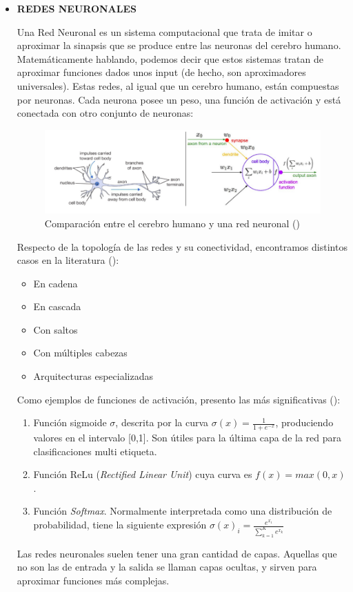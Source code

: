 \begin{itemize}
	\item \textbf{REDES NEURONALES}
	
	Una Red Neuronal es un sistema computacional que trata de imitar o aproximar la sinapsis que se produce entre las neuronas del cerebro humano. Matemáticamente hablando, podemos decir que estos sistemas tratan de aproximar funciones dados unos input (de hecho, son aproximadores universales). Estas redes, al igual que un cerebro humano, están compuestas por neuronas. Cada neurona posee un peso, una función de activación y está conectada con otro conjunto de neuronas:
	
	\begin{figure}[H] %
		\centering
		\includegraphics[scale=0.48]{nn1.png}  %
		\caption{Comparación entre el cerebro humano y una red neuronal (\cite{miriam})} 
		\label{fig:nn1}
	\end{figure}
	
	Respecto de la topología de las redes y su conectividad, encontramos distintos casos en la literatura (\cite{berzal}):
	
	\begin{itemize}
		\item En cadena
		\item En cascada
		\item Con saltos
		\item Con múltiples cabezas
		\item Arquitecturas especializadas
	\end{itemize}
	
	Como ejemplos de funciones de activación, presento las más significativas (\cite{miriam}):
	
	\begin{enumerate}
		\item Función sigmoide $\sigma$, descrita por la curva $\sigma(x) = \frac{1}{1+e^{-x}}$, produciendo valores en el intervalo [0,1]. Son útiles para la última capa de la red para clasificaciones multi etiqueta.
		\item Función ReLu (\textit{Rectified Linear Unit}) cuya curva es $f(x) = max(0,x)$.
		\item Función \textit{Softmax}.  Normalmente interpretada como una distribución de probabilidad, tiene la siguiente expresión $\sigma(x)_i = \frac{e^{x_i}}{\sum_{k=1}^{K} e^{x_k}}$
			\end{enumerate}
		Las redes neuronales suelen tener una gran cantidad de capas. Aquellas que no son las de entrada y la salida se llaman capas ocultas, y sirven para aproximar funciones más complejas. 
		

\end{itemize}
